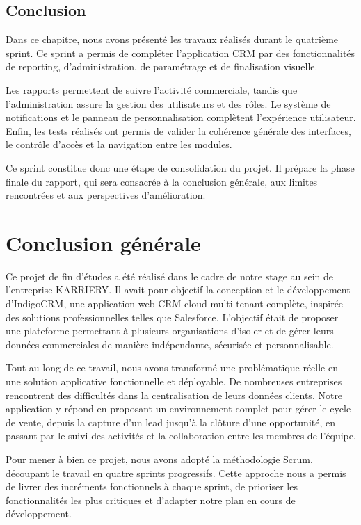 \documentclass[12pt,a4paper,twoside,openany]{book}
\begin{document}
\section*{Conclusion}

Dans ce chapitre, nous avons présenté les travaux réalisés durant le quatrième sprint. Ce sprint a permis de compléter l’application CRM par des fonctionnalités de reporting, d’administration, de paramétrage et de finalisation visuelle.

Les rapports permettent de suivre l’activité commerciale, tandis que l’administration assure la gestion des utilisateurs et des rôles. Le système de notifications et le panneau de personnalisation complètent l’expérience utilisateur. Enfin, les tests réalisés ont permis de valider la cohérence générale des interfaces, le contrôle d’accès et la navigation entre les modules.

Ce sprint constitue donc une étape de consolidation du projet. Il prépare la phase finale du rapport, qui sera consacrée à la conclusion générale, aux limites rencontrées et aux perspectives d’amélioration.

\chapter*{Conclusion générale}

Ce projet de fin d’études a été réalisé dans le cadre de notre stage au sein de l’entreprise KARRIERY. Il avait pour objectif la conception et le développement d’IndigoCRM, une application web CRM cloud multi-tenant complète, inspirée des solutions professionnelles telles que Salesforce. L’objectif était de proposer une plateforme permettant à plusieurs organisations d’isoler et de gérer leurs données commerciales de manière indépendante, sécurisée et personnalisable.

Tout au long de ce travail, nous avons transformé une problématique réelle en une solution applicative fonctionnelle et déployable. De nombreuses entreprises rencontrent des difficultés dans la centralisation de leurs données clients. Notre application y répond en proposant un environnement complet pour gérer le cycle de vente, depuis la capture d’un lead jusqu’à la clôture d’une opportunité, en passant par le suivi des activités et la collaboration entre les membres de l’équipe.

Pour mener à bien ce projet, nous avons adopté la méthodologie Scrum, découpant le travail en quatre sprints progressifs. Cette approche nous a permis de livrer des incréments fonctionnels à chaque sprint, de prioriser les fonctionnalités les plus critiques et d’adapter notre plan en cours de développement.
\end{document}
